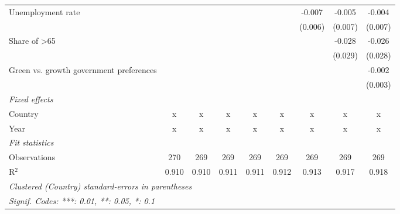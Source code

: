 \begin{table}[htbp]
\begin{tabular}{lcccccccc}
      Unemployment rate                                                  &         &         &         &         &         & -0.007  & -0.005  & -0.004\\   
                                                                         &         &         &         &         &         & (0.006) & (0.007) & (0.007)\\   
      Share of >65                                                       &         &         &         &         &         &         & -0.028  & -0.026\\   
                                                                         &         &         &         &         &         &         & (0.029) & (0.028)\\   
      Green vs. growth government preferences                            &         &         &         &         &         &         &         & -0.002\\   
                                                                         &         &         &         &         &         &         &         & (0.003)\\   
      \emph{Fixed effects}\\
      Country                                                            & x       & x       & x       & x       & x       & x       & x       & x\\  
      Year                                                               & x       & x       & x       & x       & x       & x       & x       & x\\  
      \midrule \emph{Fit statistics}\\
      Observations                                                       & 270     & 269     & 269     & 269     & 269     & 269     & 269     & 269\\  
      R$^2$                                                              & 0.910   & 0.910   & 0.911   & 0.911   & 0.912   & 0.913   & 0.917   & 0.918\\  
      \midrule
      \multicolumn{9}{l}{\emph{Clustered (Country) standard-errors in parentheses}}\\
      \multicolumn{9}{l}{\emph{Signif. Codes: ***: 0.01, **: 0.05, *: 0.1}}\\
   \end{tabular}
\end{table}



